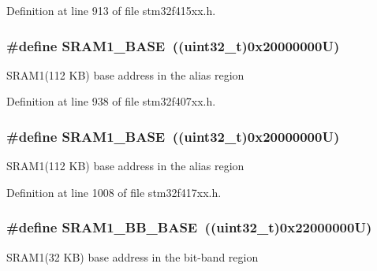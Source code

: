Definition at line 913 of file stm32f415xx.\+h.

\subsubsection[{\texorpdfstring{S\+R\+A\+M1\+\_\+\+B\+A\+SE}{SRAM1_BASE}}]{\setlength{\rightskip}{0pt plus 5cm}\#define S\+R\+A\+M1\+\_\+\+B\+A\+SE~((uint32\+\_\+t)0x20000000\+U)}\hypertarget{group___peripheral__registers__structures_ga7d0fbfb8894012dbbb96754b95e562cd}{}\label{group___peripheral__registers__structures_ga7d0fbfb8894012dbbb96754b95e562cd}
S\+R\+A\+M1(112 K\+B) base address in the alias region 

Definition at line 938 of file stm32f407xx.\+h.

\subsubsection[{\texorpdfstring{S\+R\+A\+M1\+\_\+\+B\+A\+SE}{SRAM1_BASE}}]{\setlength{\rightskip}{0pt plus 5cm}\#define S\+R\+A\+M1\+\_\+\+B\+A\+SE~((uint32\+\_\+t)0x20000000\+U)}\hypertarget{group___peripheral__registers__structures_ga7d0fbfb8894012dbbb96754b95e562cd}{}\label{group___peripheral__registers__structures_ga7d0fbfb8894012dbbb96754b95e562cd}
S\+R\+A\+M1(112 K\+B) base address in the alias region 

Definition at line 1008 of file stm32f417xx.\+h.

\subsubsection[{\texorpdfstring{S\+R\+A\+M1\+\_\+\+B\+B\+\_\+\+B\+A\+SE}{SRAM1_BB_BASE}}]{\setlength{\rightskip}{0pt plus 5cm}\#define S\+R\+A\+M1\+\_\+\+B\+B\+\_\+\+B\+A\+SE~((uint32\+\_\+t)0x22000000\+U)}\hypertarget{group___peripheral__registers__structures_gac4c4f61082e4b168f29d9cf97dc3ca5c}{}\label{group___peripheral__registers__structures_gac4c4f61082e4b168f29d9cf97dc3ca5c}
S\+R\+A\+M1(32 K\+B) base address in the bit-\/band region 

